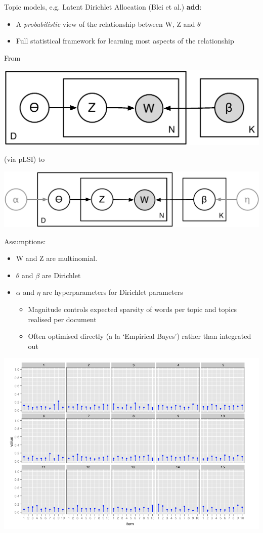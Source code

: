 \documentclass[11pt,compress,professionalfonts]{beamer}
\newcommand{\ita}{\begin{itemize}}
\newcommand{\itm}{\item[]}
\newcommand{\itz}{\end{itemize}}
\begin{document}

Topic models, e.g. Latent Dirichlet Allocation (Blei et al.) \textbf{add}:
\ita
\itm A \textit{probabilistic} view of the relationship between W, Z and $\theta$ 
\itm Full statistical framework for learning most aspects of the relationship
\itz


From

\centerline{\includegraphics[scale=.8]{pictures/new-topics-ca}}

(via pLSI) to

\centerline{\includegraphics[scale=.8]{pictures/lda-flat}}


Assumptions:
\ita
\itm W and Z are multinomial.  
\itm $\theta$ and $\beta$ are Dirichlet 
\itm $\alpha$ and $\eta$ are hyperparameters for Dirichlet parameters
\ita
\item Magnitude controls expected sparsity of words per topic and topics realised per document
\item Often optimised directly (a la `Empirical Bayes') rather than integrated out
\itz
\itz


\centerline{\includegraphics[scale=1]{pictures/dirichlet-alpha10}}
\end{document}

